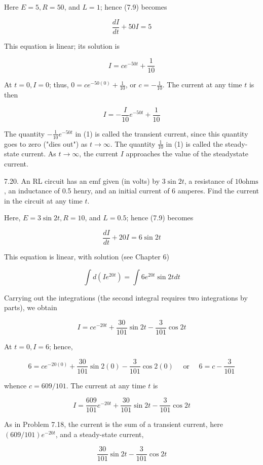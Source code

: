 \documentclass[10pt]{article}
\begin{document}
Here $E=5, R=50$, and $L=1$; hence (7.9) becomes

$$
\frac{d I}{d t}+50 I=5
$$

This equation is linear; its solution is

$$
I=c e^{-50 t}+\frac{1}{10}
$$

At $t=0, I=0$; thus, $0=c e^{-50(0)}+\frac{1}{10}$, or $c=-\frac{1}{10}$. The current at any time $t$ is then


\begin{equation*}
I=-\frac{I}{10} e^{-50 t}+\frac{1}{10} \tag{1}
\end{equation*}


The quantity $-\frac{1}{10} e^{-50 t}$ in (1) is called the transient current, since this quantity goes to zero ("dies out") as $t \rightarrow \infty$. The quantity $\frac{1}{10}$ in (1) is called the steady-state current. As $t \rightarrow \infty$, the current $I$ approaches the value of the steadystate current.

7.20. An RL circuit has an emf given (in volts) by $3 \sin 2 t$, a resistance of $10 \mathrm{ohms}$, an inductance of 0.5 henry, and an initial current of 6 amperes. Find the current in the circuit at any time $t$.

Here, $E=3 \sin 2 t, R=10$, and $L=0.5$; hence (7.9) becomes

$$
\frac{d I}{d t}+20 I=6 \sin 2 t
$$

This equation is linear, with solution (see Chapter 6)

$$
\int d\left(I e^{20 t}\right)=\int 6 e^{20 t} \sin 2 t d t
$$

Carrying out the integrations (the second integral requires two integrations by parts), we obtain

$$
I=c e^{-20 t}+\frac{30}{101} \sin 2 t-\frac{3}{101} \cos 2 t
$$

At $t=0, I=6$; hence,

$$
6=c e^{-20(0)}+\frac{30}{101} \sin 2(0)-\frac{3}{101} \cos 2(0) \quad \text { or } \quad 6=c-\frac{3}{101}
$$

whence $c=609 / 101$. The current at any time $t$ is

$$
I=\frac{609}{101} e^{-20 t}+\frac{30}{101} \sin 2 t-\frac{3}{101} \cos 2 t
$$

As in Problem 7.18, the current is the sum of a transient current, here $(609 / 101) e^{-20 t}$, and a steady-state current,

$$
\frac{30}{101} \sin 2 t-\frac{3}{101} \cos 2 t
$$
\end{document}
